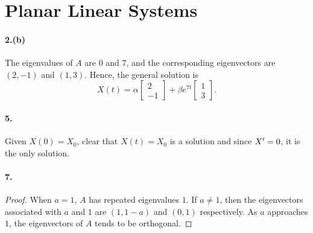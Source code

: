 \setcounter{section}{1}
\section{Planar Linear Systems}

\paragraph{2.(b)}
\begin{solution}
  The eigenvalues of $A$ are $0$ and $7$, and the corresponding eigenvectors are
  $(2,-1)$ and $(1,3)$. Hence, the general solution is
  \[
    X(t) = \alpha \begin{bmatrix}2 \\ -1\end{bmatrix}
    + \beta e^{7t}\begin{bmatrix}1 \\ 3\end{bmatrix}.
  \]
\end{solution}

\paragraph{5.}
\begin{solution}
  Given $X(0)=X_0$, clear that $X(t)=X_0$ is a solution and since $X^\prime=0$, it
  is the only solution.
\end{solution}

\paragraph{7.}
\begin{proof}
  When $a = 1$, $A$ has repeated eigenvalues $1$. If $a \ne 1$, then the 
  eigenvectors associated with $a$ and $1$ are $(1, 1-a)$ and $(0, 1)$ 
  respectively. As $a$ approaches $1$, the eigenvectors of $A$ tends to be
  orthogonal.
\end{proof}
